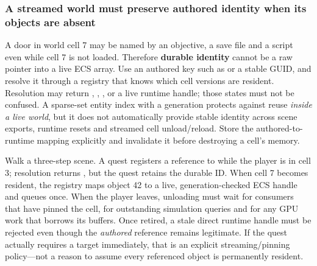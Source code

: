 \subsubsection{A streamed world must preserve authored identity when its objects are absent}\label{06-engine-ii-ch031-a-streamed-world-must-preserve-authored-identity-when-its-objects-are-absent}

\hypertarget{06-engine-ii-ch031-a-streamed-world-must-preserve-authored-identity-when-its-objects-are-absent}{}

A door in world cell 7 may be named by an objective, a save file and a script even while cell 7 is not loaded. Therefore \textbf{durable identity} cannot be a raw pointer into a live ECS array. Use an authored key such as  or a stable GUID, and resolve it through a registry that knows which cell versions are resident. Resolution may return , , , or a live runtime handle; those states must not be confused. A sparse-set entity index with a generation protects against reuse \emph{inside a live world}, but it does not automatically provide stable identity across scene exports, runtime resets and streamed cell unload/reload. Store the authored-to-runtime mapping explicitly and invalidate it before destroying a cell's memory.

Walk a three-step scene. A quest registers a reference to  while the player is in cell 3; resolution returns , but the quest retains the durable ID. When cell 7 becomes resident, the registry maps object 42 to a live, generation-checked ECS handle and queues  once. When the player leaves, unloading must wait for consumers that have pinned the cell, for outstanding simulation queries and for any GPU work that borrows its buffers. Once retired, a stale direct runtime handle must be rejected even though the \emph{authored} reference remains legitimate. If the quest actually requires a target immediately, that is an explicit streaming/pinning policy---not a reason to assume every referenced object is permanently resident.

